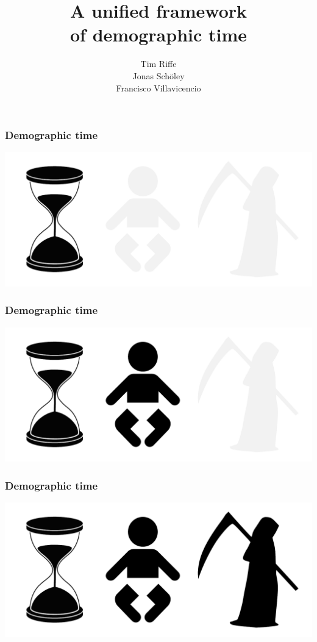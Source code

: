 \documentclass[20pt]{beamer}
\title{A unified framework\\ of demographic time}
\subtitle{Tim Riffe \\ Jonas Sch{\"o}ley \\ Francisco Villavicencio}		%
\begin{document}

\begin{frame}
	\titlepage
\end{frame}
\begin{frame}
\frametitle{Demographic time}
\begin{center}
\includegraphics[scale=1]{Figures/DemoTime1.pdf}
\end{center}
\end{frame}
\begin{frame}
\frametitle{Demographic time}
\begin{center}
\includegraphics[scale=1]{Figures/DemoTime2.pdf}
\end{center}
\end{frame}
\begin{frame}
\frametitle{Demographic time}
\begin{center}
\includegraphics[scale=1]{Figures/DemoTime3.pdf}
\end{center}
\end{frame}
\end{document}
